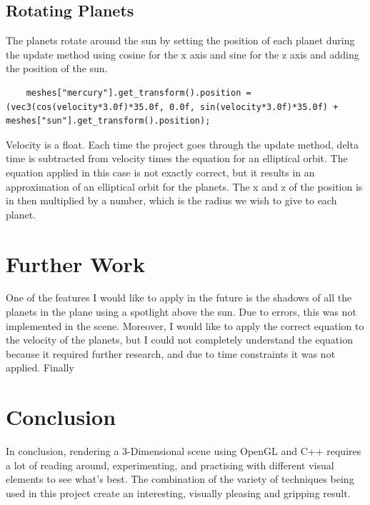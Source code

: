 \documentclass[10pt, a4paper]{article}
\begin{document}
\subsection{Rotating Planets}	

	The planets rotate around the sun by setting the position of each planet during the update method using cosine for the x axis and sine for the z axis and adding the position of the sun.
	\begin{lstlisting}
	meshes["mercury"].get_transform().position = (vec3(cos(velocity*3.0f)*35.0f, 0.0f, sin(velocity*3.0f)*35.0f) + meshes["sun"].get_transform().position); 
	\end{lstlisting}
	 Velocity is a float. Each time the project goes through the update method, delta time is subtracted from velocity times the equation for an elliptical orbit. The equation applied in this case is not exactly correct, but it results in an approximation of an elliptical orbit for the planets. The x and z of the position is in then multiplied by a number, which is the radius we wish to give to each planet.
	 
\section{Further Work}	 
	
	One of the features I would like to apply in the future is the shadows of all the planets in the plane using a spotlight above the sun. Due to errors, this was not implemented in the scene. Moreover, I would like to apply the correct equation to the velocity of the planets, but I could not completely understand the equation because it required further research, and due to time constraints it was not applied. Finally
	
	
\section{Conclusion}	

	In conclusion, rendering a 3-Dimensional scene using OpenGL and C++ requires a lot of reading around, experimenting, and practising with different visual elements to see what's best. The combination of the variety of techniques being used in this project create an interesting, visually pleasing and gripping result.
	
	




		
\end{document}
